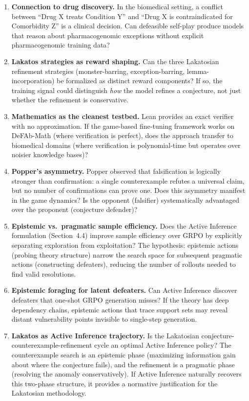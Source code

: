 \documentclass{article}
\begin{document}
\begin{enumerate}
    \item \textbf{Connection to drug discovery.} In the biomedical setting, a conflict between ``Drug X treats Condition Y'' and ``Drug X is contraindicated for Comorbidity Z'' is a clinical decision. Can defeasible self-play produce models that reason about pharmacogenomic exceptions without explicit pharmacogenomic training data?
    \item \textbf{Lakatos strategies as reward shaping.} Can the three Lakatosian refinement strategies (monster-barring, exception-barring, lemma-incorporation) be formalized as distinct reward components? If so, the training signal could distinguish \emph{how} the model refines a conjecture, not just whether the refinement is conservative.
    \item \textbf{Mathematics as the cleanest testbed.} Lean provides an exact verifier with no approximation. If the game-based fine-tuning framework works on DeFAb-Math (where verification is perfect), does the approach transfer to biomedical domains (where verification is polynomial-time but operates over noisier knowledge bases)?
    \item \textbf{Popper's asymmetry.} Popper observed that falsification is logically stronger than confirmation: a single counterexample refutes a universal claim, but no number of confirmations can prove one. Does this asymmetry manifest in the game dynamics? Is the opponent (falsifier) systematically advantaged over the proponent (conjecture defender)?
    \item \textbf{Epistemic vs.\ pragmatic sample efficiency.} Does the Active Inference formulation (Section~4.4) improve sample efficiency over GRPO by explicitly separating exploration from exploitation? The hypothesis: epistemic actions (probing theory structure) narrow the search space for subsequent pragmatic actions (constructing defeaters), reducing the number of rollouts needed to find valid resolutions.
    \item \textbf{Epistemic foraging for latent defeaters.} Can Active Inference discover defeaters that one-shot GRPO generation misses? If the theory has deep dependency chains, epistemic actions that trace support sets may reveal distant vulnerability points invisible to single-step generation.
    \item \textbf{Lakatos as Active Inference trajectory.} Is the Lakatosian conjecture-counterexample-refinement cycle an optimal Active Inference policy? The counterexample search is an epistemic phase (maximizing information gain about where the conjecture fails), and the refinement is a pragmatic phase (resolving the anomaly conservatively). If Active Inference naturally recovers this two-phase structure, it provides a normative justification for the Lakatosian methodology.

\end{enumerate}
\end{document}
